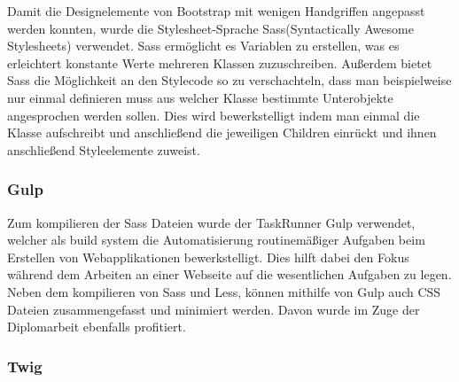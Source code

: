 Damit die Designelemente von Bootstrap mit wenigen Handgriffen angepasst werden konnten, wurde die Stylesheet-Sprache {Sass\cite{sass}}(Syntactically Awesome Stylesheets) verwendet. Sass ermöglicht es Variablen zu erstellen, was es erleichtert konstante Werte mehreren Klassen zuzuschreiben. Außerdem bietet Sass die Möglichkeit an den Stylecode so zu verschachteln, dass man beispielweise nur einmal definieren muss aus welcher Klasse bestimmte Unterobjekte angesprochen werden sollen. Dies wird bewerkstelligt indem man einmal die Klasse aufschreibt und anschließend die jeweiligen Children einrückt und ihnen anschließend Styleelemente zuweist.

    \subsubsection{Gulp}

Zum kompilieren der Sass Dateien wurde der TaskRunner {Gulp\cite{gulp}} verwendet, welcher als build system die Automatisierung routinemäßiger Aufgaben beim Erstellen von Webapplikationen bewerkstelligt. Dies hilft dabei den Fokus während dem Arbeiten an einer Webseite auf die wesentlichen Aufgaben zu legen. Neben dem kompilieren von Sass und Less, können mithilfe von Gulp auch CSS Dateien zusammengefasst und minimiert werden. Davon wurde im Zuge der Diplomarbeit ebenfalls profitiert.

    \subsubsection{Twig}

